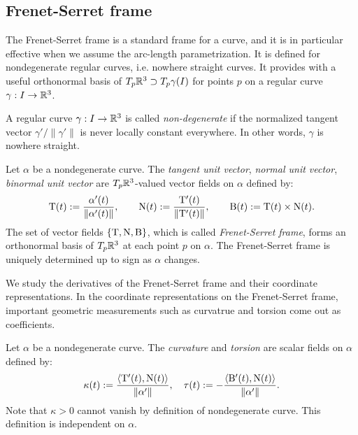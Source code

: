 \documentclass{../note}
\def\a{\alpha}
\begin{document}
\begin{prb}
\section{Frenet-Serret frame}

The Frenet-Serret frame is a standard frame for a curve, and it is in particular effective when we assume the arc-length parametrization.
It is defined for nondegenerate regular curves, i.e. nowhere straight curves.
It provides with a useful orthonormal basis of $T_p\mathbb{R}^3\supset T_p\gamma(I)$ for points $p$ on a regular curve $\gamma:I\to\mathbb{R}^3$.
\begin{prb}
A regular curve $\gamma:I\to\mathbb{R}^3$ is called \emph{non-degenerate} if the normalized tangent vector $\gamma'/\|\gamma'\|$ is never locally constant everywhere.
In other words, $\gamma$ is nowhere straight.
\end{prb}

\begin{defn}
Let $\a$ be a nondegenerate curve.
The \emph{tangent unit vector}, \emph{normal unit vector}, \emph{binormal unit vector} are $T_p\mathbb{R}^3$-valued vector fields on $\a$ defined by:
\[\rT(t):=\frac{\a'(t)}{\|\a'(t)\|},\qquad\rN(t):=\frac{\rT'(t)}{\|\rT'(t)\|},\qquad\rB(t):=\rT(t)\times\rN(t).\]
The set of vector fields $\{\mathrm{T},\mathrm{N},\mathrm{B}\}$, which is called \emph{Frenet-Serret frame}, forms an orthonormal basis of $T_p\mathbb{R}^3$ at each point $p$ on $\a$.
The Frenet-Serret frame is uniquely determined up to sign as $\a$ changes.
\end{defn}

We study the derivatives of the Frenet-Serret frame and their coordinate representations.
In the coordinate representations on the Frenet-Serret frame, important geometric measurements such as curvatrue and torsion come out as coefficients.

\begin{defn}
Let $\a$ be a nondegenerate curve.
The \emph{curvature} and \emph{torsion} are scalar fields on $\a$ defined by:
\[\kappa(t):=\frac{\<\rT'(t),\rN(t)\>}{\|\a'\|},\quad\tau(t):=-\frac{\<\rB'(t),\rN(t)\>}{\|\a'\|}.\]
Note that $\kappa>0$ cannot vanish by definition of nondegenerate curve.
This definition is independent on $\a$.
\end{defn}


\end{prb}
\end{document}
